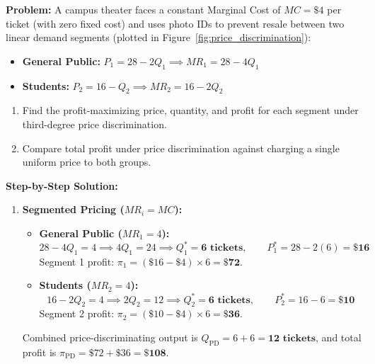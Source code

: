 \documentclass[11pt,letterpaper]{article}
\begin{document}
\begin{tcolorbox}[colback=CourseTeal!6!white,colframe=CourseTeal,title=\textbf{Work It Out: Third-Degree Price Discrimination at a Campus Theater}]
\noindent\textbf{Problem:}
A campus theater faces a constant Marginal Cost of $MC = \$4$ per ticket (with zero fixed cost) and uses photo IDs to prevent resale between two linear demand segments (plotted in Figure~\ref{fig:price_discrimination}):
\begin{itemize}
    \item \textbf{General Public:} $P_1 = 28 - 2Q_1 \implies MR_1 = 28 - 4Q_1$
    \item \textbf{Students:} $P_2 = 16 - Q_2 \implies MR_2 = 16 - 2Q_2$
\end{itemize}
\begin{enumerate}
    \item Find the profit-maximizing price, quantity, and profit for each segment under third-degree price discrimination.
    \item Compare total profit under price discrimination against charging a single uniform price to both groups.
\end{enumerate}

\noindent\textbf{Step-by-Step Solution:}
\begin{enumerate}
    \item \textbf{Segmented Pricing ($MR_i = MC$):}
    \begin{itemize}
        \item \textbf{General Public ($MR_1 = 4$):}
        \[
        28 - 4Q_1 = 4 \implies 4Q_1 = 24 \implies Q_1^* = \mathbf{6\text{ tickets}}, \qquad P_1^* = 28 - 2(6) = \mathbf{\$16}
        \]
        Segment 1 profit: $\pi_1 = (\$16 - \$4) \times 6 = \mathbf{\$72}$.
        \item \textbf{Students ($MR_2 = 4$):}
        \[
        16 - 2Q_2 = 4 \implies 2Q_2 = 12 \implies Q_2^* = \mathbf{6\text{ tickets}}, \qquad P_2^* = 16 - 6 = \mathbf{\$10}
        \]
        Segment 2 profit: $\pi_2 = (\$10 - \$4) \times 6 = \mathbf{\$36}$.
    \end{itemize}
    Combined price-discriminating output is $Q_{\text{PD}} = 6 + 6 = \mathbf{12\text{ tickets}}$, and total profit is $\pi_{\text{PD}} = \$72 + \$36 = \mathbf{\$108}$.


\end{enumerate}
\end{tcolorbox}
\end{document}
